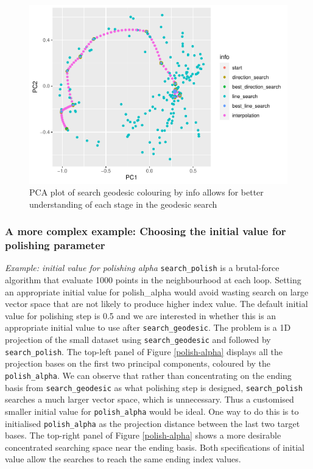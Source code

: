 \documentclass[12pt]{article}
\begin{document}
\begin{figure}
\centering
\includegraphics{paper_files/figure-latex/pca-1.pdf}
\caption{\label{pca}PCA plot of search geodesic colouring by info allows
for better understanding of each stage in the geodesic search}
\end{figure}

\hypertarget{a-more-complex-example-choosing-the-initial-value-for-polishing-parameter}{%
\subsubsection{A more complex example: Choosing the initial value for
polishing
parameter}\label{a-more-complex-example-choosing-the-initial-value-for-polishing-parameter}}

\emph{Example: initial value for polishing alpha}
\texttt{search\_polish} is a brutal-force algorithm that evaluate 1000
points in the neighbourhood at each loop. Setting an appropriate initial
value for polish\_alpha would avoid wasting search on large vector space
that are not likely to produce higher index value. The default initial
value for polishing step is 0.5 and we are interested in whether this is
an appropriate initial value to use after \texttt{search\_geodesic}. The
problem is a 1D projection of the small dataset using
\texttt{search\_geodesic} and followed by \texttt{search\_polish}. The
top-left panel of Figure \ref{polish-alpha} displays all the projection
bases on the first two principal components, coloured by the
\texttt{polish\_alpha}. We can observe that rather than concentrating on
the ending basis from \texttt{search\_geodesic} as what polishing step
is designed, \texttt{search\_polish} searches a much larger vector
space, which is unnecessary. Thus a customised smaller initial value for
\texttt{polish\_alpha} would be ideal. One way to do this is to
initialised \texttt{polish\_alpha} as the projection distance between
the last two target bases. The top-right panel of Figure
\ref{polish-alpha} shows a more desirable concentrated searching space
near the ending basis. Both specifications of initial value allow the
searches to reach the same ending index values.
\end{document}
